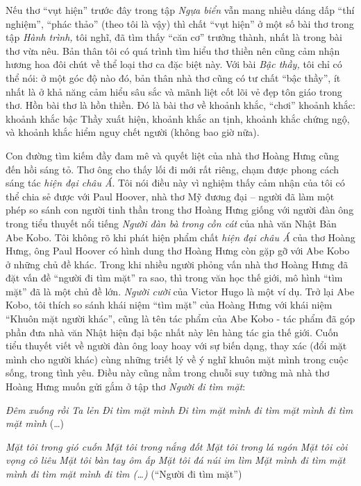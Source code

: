 \documentclass[../main.tex]{subfiles}
\begin{document}
\begin{multicols}{2}
Nếu thơ “vụt hiện” trước đây trong tập \textit{Ngựa biển} vẫn mang nhiều dáng dấp “thí nghiệm”, “phác thảo” (theo tôi là vậy) thì chất “vụt hiện” ở một số bài thơ trong tập \textit{Hành trình, }tôi nghĩ, đã tìm thấy “căn cơ” trưởng thành, nhất là trong bài thơ vừa nêu. Bản thân tôi có quá trình tìm hiểu thơ thiền nên cũng cảm nhận hương hoa đôi chút về thể loại thơ ca đặc biệt này. Với bài \textit{Bậc thầy, }tôi chỉ có thể nói: ở một góc độ nào đó, bản thân nhà thơ cũng có tư chất “bậc thầy”, ít nhất là ở khả năng cảm hiểu sâu sắc và mãnh liệt cốt lõi vẻ đẹp tôn giáo trong thơ. Hồn bài thơ là hồn thiền. Đó là bài thơ về khoảnh khắc, “chơi” khoảnh khắc: khoảnh khắc bậc Thầy xuất hiện, khoảnh khắc an tịnh, khoảnh khắc chứng ngộ, và khoảnh khắc hiểm nguy chết người (không bao giờ nữa).  
 
Con đường tìm kiếm đầy đam mê và quyết liệt của nhà thơ Hoàng Hưng cũng đến hồi sáng tỏ. Thơ ông cho thấy lối đi mới rất riêng, chạm được phong cách sáng tác \textit{hiện đại châu Á}. Tôi nói điều này vì nghiệm thấy cảm nhận của tôi có thể chia sẻ được với Paul Hoover, nhà thơ Mỹ đương đại – người đã làm một phép so sánh con người tinh thần trong thơ Hoàng Hưng giống với người đàn ông trong tiểu thuyết nổi tiếng \textit{Người đàn bà trong cồn cát }của nhà văn Nhật Bản Abe Kobo. Tôi không rõ khi phát hiện phẩm chất \textit{hiện đại châu Á} của thơ Hoàng Hưng, ông Paul Hoover có hình dung thơ Hoàng Hưng còn gặp gỡ với Abe Kobo ở những chủ đề khác. Trong khi nhiều người phỏng vấn nhà thơ Hoàng Hưng đã đặt vấn đề “người đi tìm mặt” ra sao, thì trong văn học thế giới, mô hình “tìm mặt” đã là một chủ đề lớn. \textit{Người cười }của Victor Hugo là một ví dụ. Trở lại Abe Kobo, tôi thích so sánh khái niệm “tìm mặt” của Hoàng Hưng với khái niệm “Khuôn mặt người khác”, cũng là tên tác phẩm của Abe Kobo - tác phẩm đã góp phần đưa nhà văn Nhật hiện đại bậc nhất này lên hàng tác gia thế giới. Cuốn tiểu thuyết viết về người đàn ông loay hoay với sự biến dạng, thay xác (đổi mặt mình cho người khác) cùng những triết lý về ý nghĩ khuôn mặt mình trong cuộc sống, trong tình yêu. Điều này cũng nằm trong chuỗi suy tưởng mà nhà thơ Hoàng Hưng muốn gửi gắm ở tập thơ \textit{Người đi tìm mặt}:        
\begin{blockquote}
        
\textit{Đêm xuống rồi}        
\textit{Ta lẻn}        
\textit{Đi tìm mặt mình}        
\textit{Đi tìm mặt mình đi tìm mặt mình đi tìm mặt mình}        
(…) 
        
\textit{Mặt tôi trong gió cuốn}        
\textit{Mặt tôi trong nắng đốt}        
\textit{Mặt tôi trong lá ngón}        
\textit{Mặt tôi còi vọng cô liêu}        
\textit{Mặt tôi bàn tay ôm ấp}        
\textit{Mặt tôi đá núi im lìm}        
\textit{Mặt mình đi tìm mặt mình đi tìm mặt mình đi tìm (…)}        
(“Người đi tìm mặt”) 


\end{blockquote}
\end{multicols}
\end{document}
